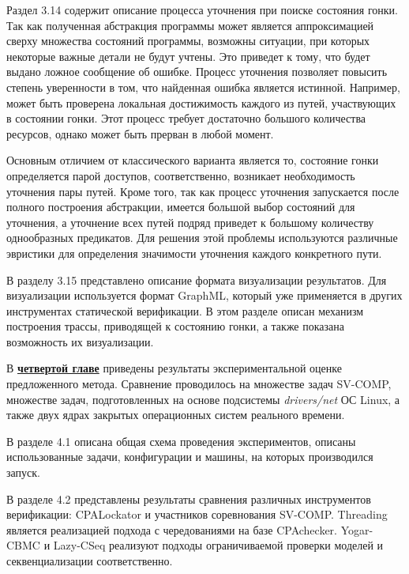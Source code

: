Раздел 3.14 содержит описание процесса уточнения при поиске состояния гонки.
Так как полученная абстракция программы может является аппроксимацией сверху множества состояний программы, возможны ситуации, при которых некоторые важные детали не будут учтены. 
Это приведет к тому, что будет выдано ложное сообщение об ошибке. 
Процесс уточнения позволяет повысить степень уверенности в том, что найденная ошибка является истинной.
Например, может быть проверена локальная достижимость каждого из путей, участвующих в состоянии гонки.
Этот процесс требует достаточно большого количества ресурсов, однако может быть прерван в любой момент.

Основным отличием от классического варианта является то, состояние гонки определяется парой доступов, соответственно, возникает необходимость уточнения пары путей.
Кроме того, так как процесс уточнения запускается после полного построения абстракции, имеется большой выбор состояний для уточнения, а уточнение всех путей подряд приведет к большому количеству однообразных предикатов.
Для решения этой проблемы используются различные эвристики для определения значимости уточнения каждого конкретного пути.

В разделу 3.15 представлено описание формата визуализации результатов.
Для визуализации используется формат GraphML, который уже применяется в других инструментах статической верификации.
В этом разделе описан механизм построения трассы, приводящей к состоянию гонки, а также показана возможность их визуализации.


В \underline{\textbf{четвертой главе}} приведены результаты экспериментальной оценке предложенного метода.
Сравнение проводилось на множестве задач SV-COMP, множестве задач, подготовленных на основе подсистемы \textit{drivers/net} ОС Linux, а также двух ядрах закрытых операционных систем реального времени.

В разделе 4.1 описана общая схема проведения экспериментов, описаны использованные задачи, конфигурации и машины, на которых производился запуск.

В разделе 4.2 представлены результаты сравнения различных инструментов верификации: CPALockator и участников соревнования SV-COMP.
Threading является реализацией подхода с чередованиями на базе CPAchecker.
Yogar-CBMC и Lazy-CSeq реализуют подходы ограничиваемой проверки моделей и секвенциализации соответственно.

